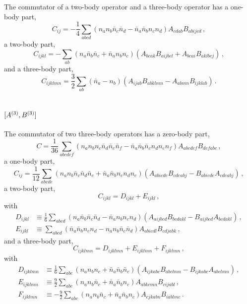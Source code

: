 The commutator of a two-body operator and a three-body operator
has a one-body part,
\begin{equation}
  C_{ij} = -\frac{1}{4} \sum_{abcd}
  (n_a n_b \bar{n}_c \bar{n}_d - \bar{n}_a \bar{n}_b n_c n_d)
  A_{cdab} B_{abijcd}\,,
\end{equation}
a two-body part,
\begin{equation}
  C_{ijkl} = - \sum_{ab}
  (n_a \bar{n}_b \bar{n}_c + \bar{n}_a n_b n_c)
  (A_{bcak} B_{aijbcl} + A_{bcai} B_{aklbcj})\,,
\end{equation}
and a three-body part,
\begin{equation}
  C_{ijklmn} = \frac{3}{2} \sum_{ab} (\bar{n}_a - n_b)
  (A_{ijab} B_{abklmn} - A_{abmn} B_{ijklab})\,.
\end{equation}

\section{
  \texorpdfstring{$[{A}^{(3)}, {B}^{(3)}]$}{[3, 3]}
 }

The commutator of two three-body operators
has a zero-body part,
\begin{equation}
  C = \frac{1}{36} \sum_{abcdef}
  (
  n_a n_b n_c \bar{n}_d \bar{n}_e \bar{n}_f
  - \bar{n}_a \bar{n}_b \bar{n}_c n_d n_e n_f
  )
  A_{abcdef} B_{defabc}\,,
\end{equation}
a one-body part,
\begin{equation}
  C_{ij} = \frac{1}{12}
  \sum_{abcde} (
  n_a n_b \bar{n}_c \bar{n}_d \bar{n}_e
  + \bar{n}_a \bar{n}_b n_c n_d n_e
  )
  (
  A_{abicde} B_{cdeabj}
  - B_{abicde} A_{cdeabj}
  )\,,
\end{equation}
a two-body part,
\begin{equation}
  C_{ijkl} = D_{ijkl} + E_{ijkl}\,,
\end{equation}
with
\begin{align}
  D_{ijkl} & \equiv \frac{1}{6} \sum_{abcd}
  (
  n_a \bar{n}_b \bar{n}_c \bar{n}_d
  - \bar{n}_a n_b n_c n_d
  )
  (
  A_{aijbcd} B_{bcdakl}
  - B_{aijbcd} A_{bcdakl}
  )\,,                                      \\
  E_{ijkl} & \equiv \sum_{abcd}
  (
  \bar{n}_a \bar{n}_b n_c n_d
  - n_a n_b \bar{n}_c \bar{n}_d
  )
  A_{abicdl} B_{cdjabk}\,,
\end{align}
and a three-body part,
\begin{equation}
  C_{ijklmn} = D_{ijklmn} + E_{ijklmn} + F_{ijklmn}\,,
\end{equation}
with
\begin{align}
  D_{ijklmn} & \equiv \frac{1}{6} \sum_{abc}
  (n_a n_b n_c + \bar{n}_a \bar{n}_b \bar{n}_c)
  (A_{ijkabc} B_{abclmn} - B_{ijkabc} A_{abclmn})\,, \\
  E_{ijklmn} & \equiv \frac{9}{2} \sum_{abc}
  (n_a n_b \bar{n}_c +  \bar{n}_a \bar{n}_b n_c)
  A_{abkcmn} B_{cijabl}\,,                           \\
  F_{ijklmn} & \equiv -\frac{9}{2} \sum_{abc}
  (n_a n_b \bar{n}_c +  \bar{n}_a \bar{n}_b n_c)
  A_{cjkabn} B_{iablmc}\,.
\end{align}
